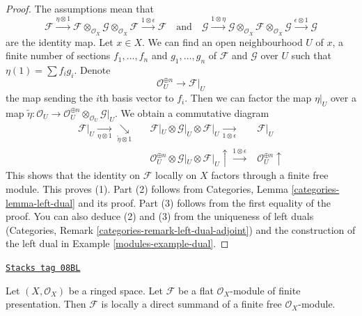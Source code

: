 \begin{proof}

The assumptions mean that
$$
\mathcal{F} \xrightarrow{\eta \otimes 1}
\mathcal{F} \otimes_{\mathcal{O}_X} \mathcal{G}
\otimes_{\mathcal{O}_X} \mathcal{F}
\xrightarrow{1 \otimes \epsilon} \mathcal{F}
\quad\text{and}\quad
\mathcal{G} \xrightarrow{1 \otimes \eta}
\mathcal{G} \otimes_{\mathcal{O}_X} \mathcal{F}
\otimes_{\mathcal{O}_X} \mathcal{G}
\xrightarrow{\epsilon \otimes 1} \mathcal{G}
$$
are the identity map. Let $x \in X$. We can find an open neighbourhood
$U$ of $x$, a finite number of sections $f_1, \ldots, f_n$
and $g_1, \ldots, g_n$ of
$\mathcal{F}$ and $\mathcal{G}$ over $U$ such that
$\eta(1) = \sum f_i g_i$. Denote
$$
\mathcal{O}_U^{\oplus n} \to \mathcal{F}|_U
$$
the map sending the $i$th basis vector to $f_i$. Then we
can factor the map $\eta|_U$ over a map
$\tilde \eta : \mathcal{O}_U \to
\mathcal{O}_U^{\oplus n} \otimes_{\mathcal{O}_U} \mathcal{G}|_U$.
We obtain a commutative diagram
$$
\begin{array}{cccc}\mathcal{F}|_U
\underset{\eta \otimes 1}{\longrightarrow}\underset{\tilde \eta \otimes 1}{\searrow} &  & \mathcal{F}|_U \otimes \mathcal{G}|_U \otimes \mathcal{F}|_U
\underset{1 \otimes \epsilon}{\longrightarrow} & \mathcal{F}|_U \\  &  & \mathcal{O}_U^{\oplus n} \otimes \mathcal{G}|_U \otimes \mathcal{F}|_U
\uparrow\overset{1 \otimes \epsilon}{\longrightarrow} & \mathcal{O}_U^{\oplus n} \uparrow\end{array}
$$
This shows that the identity on $\mathcal{F}$ locally on $X$
factors through a finite free module. This proves (1). Part (2) follows from
Categories, Lemma \ref{categories-lemma-left-dual} and its proof.
Part (3) follows from the first equality of the proof.
You can also deduce (2) and (3) from the uniqueness of left duals
(Categories, Remark \ref{categories-remark-left-dual-adjoint})
and the construction of the left dual in
Example \ref{modules-example-dual}.
\end{proof}

\begin{lemma}
\label{modules-lemma-flat-locally-finite-presentation}
\href{https://stacks.math.columbia.edu/tag/08BL}{\texttt{Stacks tag 08BL}}

Let $(X, \mathcal{O}_X)$ be a ringed space. Let $\mathcal{F}$ be a
flat $\mathcal{O}_X$-module of finite presentation. Then $\mathcal{F}$ is
locally a direct summand of a finite free $\mathcal{O}_X$-module.
\end{lemma}

